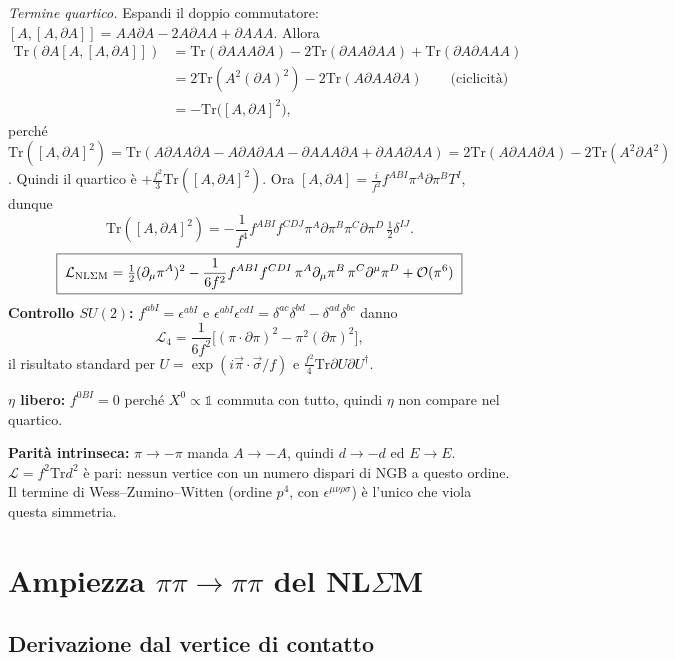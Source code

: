 \documentclass[11pt,a4paper]{article}
\numberwithin{equation}{section}
\theoremstyle{remark}
\newcommand{\Tr}{\mathrm{Tr}}
\newcommand{\one}{\mathbb{1}}
\begin{document}
\emph{Termine quartico.} Espandi il doppio commutatore: $[A,[A,\partial A]]=AA\partial A-2A\partial AA+\partial AAA$. Allora
\begin{align*}
\Tr(\partial A[A,[A,\partial A]])&=\Tr(\partial AAA\partial A)-2\Tr(\partial AA\partial AA)+\Tr(\partial A\partial AAA)\\
&=2\Tr(A^2(\partial A)^2)-2\Tr(A\partial AA\partial A)\qquad\text{(ciclicità)}\\
&=-\Tr\big([A,\partial A]^2\big),
\end{align*}
perché $\Tr([A,\partial A]^2)=\Tr(A\partial AA\partial A-A\partial A\partial AA-\partial AAA\partial A+\partial AA\partial AA)=2\Tr(A\partial AA\partial A)-2\Tr(A^2\partial A^2)$. Quindi il quartico è $+\frac{f^2}{3}\Tr([A,\partial A]^2)$. Ora $[A,\partial A]=\frac{i}{f^2}f^{ABI}\pi^A\partial\pi^BT^I$, dunque
\[
\Tr([A,\partial A]^2)=-\frac{1}{f^4}f^{ABI}f^{CDJ}\pi^A\partial\pi^B\pi^C\partial\pi^D\,\tfrac12\delta^{IJ}.
\]
\begin{equation}
\boxed{\;\mathcal L_{\rm NL\Sigma M}=\tfrac12(\partial_\mu\pi^A)^2-\frac{1}{6f^2}f^{ABI}f^{CDI}\,\pi^A\partial_\mu\pi^B\,\pi^C\partial^\mu\pi^D+\mathcal O(\pi^6)\;}
\label{eq:L4}
\end{equation}
\textbf{Controllo $SU(2)$:} $f^{abI}=\epsilon^{abI}$ e $\epsilon^{abI}\epsilon^{cdI}=\delta^{ac}\delta^{bd}-\delta^{ad}\delta^{bc}$ danno
\[
\mathcal L_4=\frac{1}{6f^2}\big[(\pi\cdot\partial\pi)^2-\pi^2(\partial\pi)^2\big],
\]
il risultato standard per $U=\exp(i\vec\pi\cdot\vec\sigma/f)$ e $\frac{f^2}{4}\Tr\partial U\partial U^\dagger$. \checkmark

\textbf{$\eta$ libero:} $f^{0BI}=0$ perché $X^0\propto\one$ commuta con tutto, quindi $\eta$ non compare nel quartico.

\textbf{Parità intrinseca:} $\pi\to-\pi$ manda $A\to-A$, quindi $d\to-d$ ed $E\to E$. $\mathcal L=f^2\Tr d^2$ è pari: nessun vertice con un numero dispari di NGB a questo ordine. Il termine di Wess--Zumino--Witten (ordine $p^4$, con $\epsilon^{\mu\nu\rho\sigma}$) è l'unico che viola questa simmetria.

\section{Ampiezza $\pi\pi\to\pi\pi$ del NL$\Sigma$M}
\label{sec:ampNL}

\subsection{Derivazione dal vertice di contatto}
\end{document}
